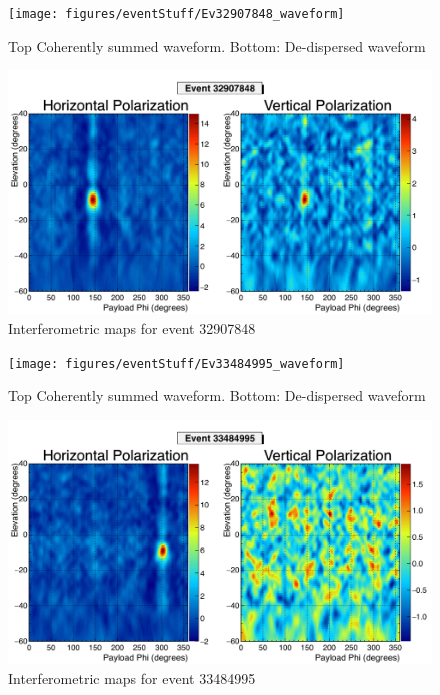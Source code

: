 		\begin{figure}
		\centering
			\texttt{[image: figures/eventStuff/Ev32907848\_waveform]}
			\caption{Top Coherently summed waveform.  Bottom: De-dispersed waveform} 
		\label{fig:Ev32907848_waveform}
		\end{figure}
		
		\begin{figure}
		\centering
			\includegraphics[width=\textwidth]{figures/intMap/intMap_ev32907848}
			\caption{Interferometric maps for event 32907848} 
		\label{fig:Ev32907848_map}
		\end{figure}	
	
		\begin{figure}
		\centering
			\texttt{[image: figures/eventStuff/Ev33484995\_waveform]}
			\caption{Top Coherently summed waveform.  Bottom: De-dispersed waveform} 
		\label{fig:Ev33484995_waveform}
		\end{figure}
		
		\begin{figure}
		\centering
			\includegraphics[width=\textwidth]{figures/intMap/intMap_ev33484995}
			\caption{Interferometric maps for event 33484995} 
		\label{fig:Ev33484995_map}
		\end{figure}			
	

